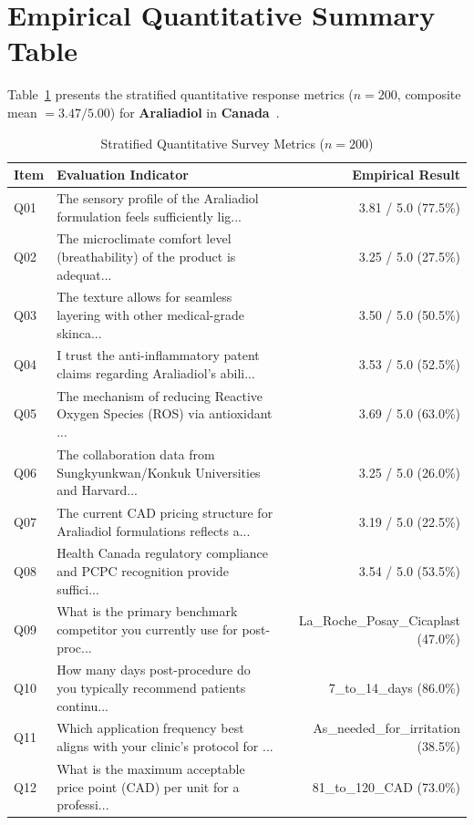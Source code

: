 \documentclass[10pt,twocolumn,a4paper]{article}
\begin{document}
\section{Empirical Quantitative Summary Table}
Table~\ref{tab:metrics} presents the stratified quantitative response metrics ($n = 200$, composite mean $= 3.47/5.00$) for \textbf{Araliadiol} in \textbf{Canada}~\cite{ref_kaggle_doi,ref_hf_doi}.

\begin{table}[t]
\centering
\caption{Stratified Quantitative Survey Metrics ($n = 200$)}
\label{tab:metrics}
\small
\begin{tabularx}{\textwidth}{l X r}
\toprule
\textbf{Item} & \textbf{Evaluation Indicator} & \textbf{Empirical Result} \\
\midrule
Q01 & The sensory profile of the Araliadiol formulation feels sufficiently lig... & 3.81 / 5.0 (77.5\%) \\
Q02 & The microclimate comfort level (breathability) of the product is adequat... & 3.25 / 5.0 (27.5\%) \\
Q03 & The texture allows for seamless layering with other medical-grade skinca... & 3.50 / 5.0 (50.5\%) \\
Q04 & I trust the anti-inflammatory patent claims regarding Araliadiol's abili... & 3.53 / 5.0 (52.5\%) \\
Q05 & The mechanism of reducing Reactive Oxygen Species (ROS) via antioxidant ... & 3.69 / 5.0 (63.0\%) \\
Q06 & The collaboration data from Sungkyunkwan/Konkuk Universities and Harvard... & 3.25 / 5.0 (26.0\%) \\
Q07 & The current CAD pricing structure for Araliadiol formulations reflects a... & 3.19 / 5.0 (22.5\%) \\
Q08 & Health Canada regulatory compliance and PCPC recognition provide suffici... & 3.54 / 5.0 (53.5\%) \\
Q09 & What is the primary benchmark competitor you currently use for post-proc... & La\_Roche\_Posay\_Cicaplast (47.0\%) \\
Q10 & How many days post-procedure do you typically recommend patients continu... & 7\_to\_14\_days (86.0\%) \\
Q11 & Which application frequency best aligns with your clinic's protocol for ... & As\_needed\_for\_irritation (38.5\%) \\
Q12 & What is the maximum acceptable price point (CAD) per unit for a professi... & 81\_to\_120\_CAD (73.0\%) \\

\end{tabularx}
\end{table}
\end{document}

